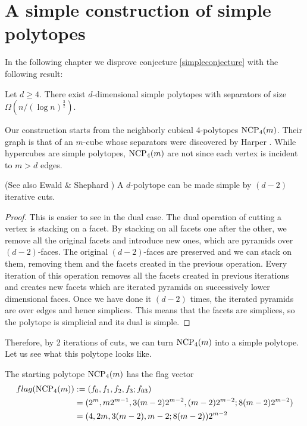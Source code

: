 \chapter{A simple construction of simple polytopes}

In the following chapter we disprove conjecture \ref{simpleconjecture} with 
the following result:

\begin{theorem}
\label{maintheorem}
 Let $d\geq 4$. There exist $d$-dimensional simple polytopes with
separators of size $\Omega(n/(\log n)^{\frac{3}{2}})$.
\end{theorem}

Our construction starts from the neighborly cubical 4-polytopes $\textrm{NCP}_4(m)$. 
Their graph is that of an $m$-cube whose separators were discovered by Harper 
\cite{Harp}.
While hypercubes are simple polytopes, $\textrm{NCP}_4(m)$ are not since each vertex is 
incident to $m>d$ edges. 

\begin{lemma}
(See also Ewald \& Shephard \cite{Ewald1974}) A $d$-polytope can be made simple 
by $(d-2)$ iterative cuts.
\end{lemma}

\begin{proof}
This is easier to see in the dual case. The dual operation of cutting a vertex 
is stacking on a facet. By stacking on all facets one after the other, we 
remove all the original facets and introduce new ones, which are pyramids over 
$(d-2)$-faces. The original $(d-2)$-faces are preserved and we can stack on 
them, removing them and the facets created in the previous operation. Every 
iteration of this operation removes all the facets created in previous 
iterations and creates new facets which are iterated pyramids on successively 
lower dimensional faces. Once we have done it $(d-2)$ times, the iterated 
pyramids are over edges and hence simplices. This means that the facets are 
simplices, so the polytope is simplicial and its dual is simple.
\end{proof}

Therefore, by 2 iterations of cuts, we can turn $\textrm{NCP}_4(m)$ into a simple 
polytope. Let us see what this polytope looks like. 

The starting polytope $\textrm{NCP}_4(m)$ has the flag vector 
\begin{align}
 flag(\textrm{NCP}_4(m)) &:= (f_0, f_1, f_2, f_3; f_{03}) \\
	&= (2^m, m2^{m-1}, 3(m-2)2^{m-2}, (m-2)2^{m-2}; 8(m-2)2^{m-2}) \\
	&= (4, 2m, 3(m-2), m-2; 8(m-2))2^{m-2}
\end{align}

